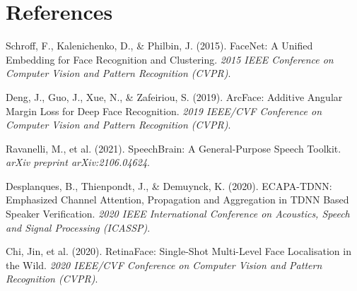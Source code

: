 \documentclass[12pt, a4paper]{article}
\begin{document}
\section{References}
\begin{thebibliography}{9}

Schroff, F., Kalenichenko, D., \& Philbin, J. (2015). FaceNet: A Unified Embedding for Face Recognition and Clustering. \textit{2015 IEEE Conference on Computer Vision and Pattern Recognition (CVPR)}.

Deng, J., Guo, J., Xue, N., \& Zafeiriou, S. (2019). ArcFace: Additive Angular Margin Loss for Deep Face Recognition. \textit{2019 IEEE/CVF Conference on Computer Vision and Pattern Recognition (CVPR)}.

Ravanelli, M., et al. (2021). SpeechBrain: A General-Purpose Speech Toolkit. \textit{arXiv preprint arXiv:2106.04624}.

Desplanques, B., Thienpondt, J., \& Demuynck, K. (2020). ECAPA-TDNN: Emphasized Channel Attention, Propagation and Aggregation in TDNN Based Speaker Verification. \textit{2020 IEEE International Conference on Acoustics, Speech and Signal Processing (ICASSP)}.

Chi, Jin, et al. (2020). RetinaFace: Single-Shot Multi-Level Face Localisation in the Wild. \textit{2020 IEEE/CVF Conference on Computer Vision and Pattern Recognition (CVPR)}.

\end{thebibliography}
\end{document}
